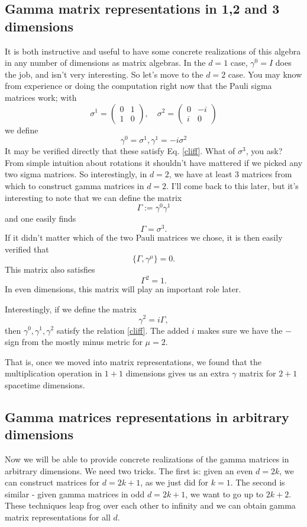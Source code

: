 \documentclass[main.tex]{subfiles}
\begin{document}
\subsection{Gamma matrix representations in 1,2 and 3 dimensions}
It is both instructive and useful to have some concrete realizations of this algebra in any number of dimensions as matrix algebras. In the $d = 1$ case, $\gamma^0 = I$ does the job, and isn't very interesting. So let's move to the $d = 2$ case. You may know from experience or doing the computation right now that the Pauli sigma matrices work; with 
\[
\sigma^1 = \begin{pmatrix}
0 & 1 \\
1 & 0 
\end{pmatrix}, \quad 
\sigma^2 = \begin{pmatrix}
0 & -i \\
i & 0 
\end{pmatrix}
\]
we define
\begin{equation} \label{g2}
\gamma^0 = \sigma^1, \gamma^1 = -i\sigma^2
\end{equation}
It may be verified directly that these satisfy Eq. \ref{cliff}. What of $\sigma^3$, you ask? From simple intuition about rotations it shouldn't have mattered if we picked any two sigma matrices. So interestingly, in $d=2$, we have at least $3$ matrices from which to construct gamma matrices in $d=2$. I'll come back to this later, but it's interesting to note that we can define the matrix
\[
\Gamma := \gamma^0 \gamma^1
\]
and one easily finds
\[
\Gamma = \sigma^3.
\]
If it didn't matter which of the two Pauli matrices we chose, it is then easily verified that 
\begin{equation}
\{\Gamma,\gamma^\mu\} = 0.
\end{equation}
This matrix also satisfies
\[
\Gamma^2 = 1.
\]
In even dimensions, this matrix will play an important role later. 

Interestingly, if we define the matrix
\[
\gamma^2 = i\Gamma,
\]
then $\gamma^0,\gamma^1,\gamma^2$ satisfy the relation \ref{cliff}. The added $i$ makes sure we have the $-$ sign from the mostly minus metric for $\mu = 2$.

That is, once we moved into matrix representations, we found that the multiplication operation in $1+1$ dimensions gives us an extra $\gamma$ matrix for $2+1$ spacetime dimensions.

\subsection{Gamma matrices representations in arbitrary dimensions}
Now we will be able to provide concrete realizations of the gamma matrices in arbitrary dimensions. We need two tricks. The first is: given an even $d = 2k$, we can construct matrices for $d = 2k+1$, as we just did for $k=1$. The second is similar - given gamma matrices in odd $d=2k+1$, we want to go up to $2k+2$. These techniques leap frog over each other to infinity and we can obtain gamma matrix representations for all $d$.
\end{document}

